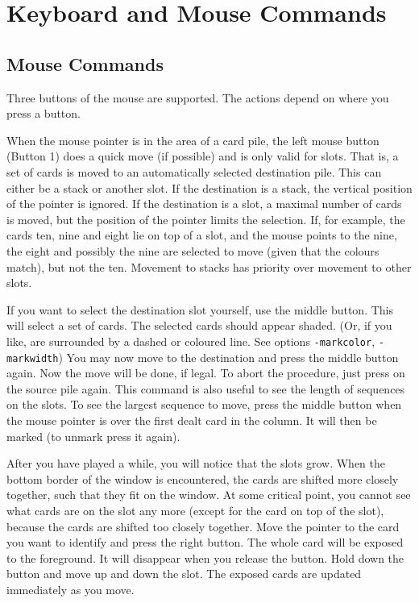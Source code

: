 \section{Keyboard and Mouse Commands}
\subsection{Mouse Commands}
Three buttons of the mouse are supported.
The actions depend on where you press a button.

When the mouse pointer
is in the area of a card pile,
the left mouse button (Button 1) does a quick move (if possible) and is only valid for slots.
That is, a set of cards
is moved to an automatically selected destination pile. This can either
be a stack or another slot.
If the destination is a stack, the vertical position of the pointer
is ignored. If the destination is a slot, a maximal number of cards is moved,
but the position of the pointer limits the selection. If, for example,
the cards ten, nine and eight lie on top of a slot, and the mouse points
to the nine, the eight and possibly the nine are selected to move
(given that the colours match), but not the ten.
Movement to stacks has priority over movement to other slots.

If you want to select the destination slot yourself, use the middle button.
This will select a set of cards. The selected cards should appear shaded.
(Or, if you like, are surrounded by a dashed or coloured line. See options
{\tt -markcolor}, {\tt -markwidth}) You may now move to the destination
and press the middle button again. Now the move will be done, if legal.
To abort the procedure, just press on the source pile again.
This command is also useful to see the length of sequences on the slots. To see
the largest sequence to move, press the middle button when the mouse pointer
is over the first dealt card in the column. It will then be marked (to unmark
press it again).

After you have played a while, you will notice that the slots grow. When the
bottom border of the window is encountered, the cards are shifted more closely
together, such that they fit on the window. At some critical point, you cannot
see what cards are on the slot any more (except for the card on top of the
slot), because the cards are shifted too closely together.  Move the pointer to
the card you want to identify and press the right button. The whole card will
be exposed to the foreground. It will disappear when you release the button.
Hold down the button and move up and down the slot. The exposed cards are
updated immediately as you move.


